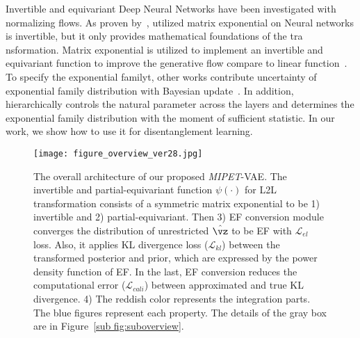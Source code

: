 Invertible and equivariant Deep Neural Networks have been investigated with normalizing flows.
As proven by~\cite{invertible-matrix-exponential}, utilized matrix exponential on Neural networks is invertible, but it only provides mathematical foundations of the tra
nsformation.
Matrix exponential is utilized to implement an invertible and equivariant function to improve the generative flow compare to linear function~\cite{NEURIPS2020_d3f06eef}.
To specify the exponential familyt, other works contribute uncertainty of exponential family distribution with Bayesian update~\cite{exponential_uncertainty_00, exponential_uncertainty_01}. In addition,~\cite{exp} hierarchically controls the natural parameter across the layers and determines the exponential family distribution with the moment of sufficient statistic.
In our work, we show how to use it for disentanglement learning.


\begin{figure}[t]
    \centering
    \centerline{\texttt{[image: figure\_overview\_ver28.jpg]}}
    \caption{The overall architecture of our proposed \textit{MIPET}-VAE.
    The invertible and partial-equivariant function $\psi(\cdot)$ for L2L transformation consists of a symmetric matrix exponential to be 1) invertible and 2) partial-equivariant.
    Then 3) EF conversion module converges the distribution of unrestricted $\hat{ \vz}$ to be EF with $\mathcal{L}_{el}$ loss.
    Also, it applies KL divergence loss ($\mathcal{L}_{kl}$) between the transformed posterior and prior, which are expressed by the power density function of EF.
    In the last, EF conversion reduces the computational error ($\mathcal{L}_{cali}$) between approximated and true KL divergence.
    4) The reddish color represents the integration parts. The blue figures represent each property.
     The details of the gray box are in Figure~\ref{sub fig:suboverview}.}
    \label{fig:overview}
\end{figure}







